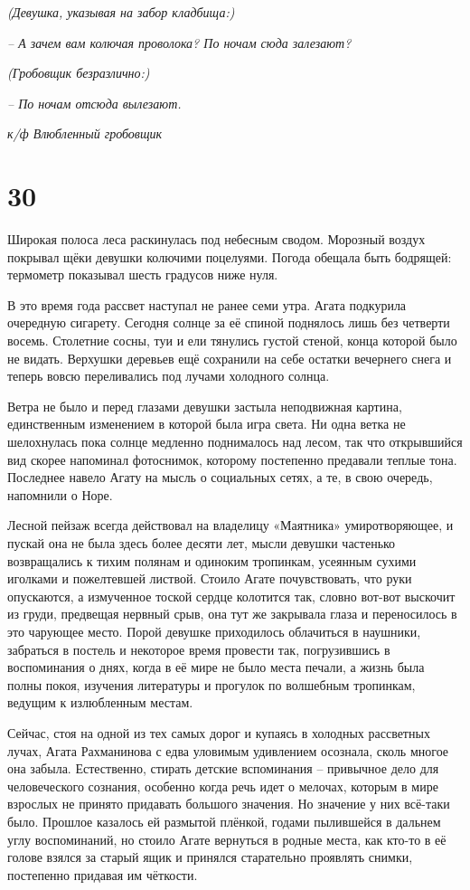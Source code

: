 \documentclass[
  a5paperpaper,
  DIV=11,
  numbers=noendperiod]{scrreprt}
\begin{document}
\emph{(Девушка, указывая на забор кладбища:)}

\emph{-- А зачем вам колючая проволока? По ночам сюда залезают?}

\emph{(Гробовщик безразлично:)}

\emph{-- По ночам отсюда вылезают.}

\emph{к/ф Влюбленный гробовщик}

\section*{30}\label{30}


Широкая полоса леса раскинулась под небесным сводом. Морозный воздух
покрывал щёки девушки колючими поцелуями. Погода обещала быть бодрящей:
термометр показывал шесть градусов ниже нуля.

В это время года рассвет наступал не ранее семи утра. Агата подкурила
очередную сигарету. Сегодня солнце за её спиной поднялось лишь без
четверти восемь. Столетние сосны, туи и ели тянулись густой стеной,
конца которой было не видать. Верхушки деревьев ещё сохранили на себе
остатки вечернего снега и теперь вовсю переливались под лучами холодного
солнца.

Ветра не было и перед глазами девушки застыла неподвижная картина,
единственным изменением в которой была игра света. Ни одна ветка не
шелохнулась пока солнце медленно поднималось над лесом, так что
открывшийся вид скорее напоминал фотоснимок, которому постепенно
предавали теплые тона. Последнее навело Агату на мысль о социальных
сетях, а те, в свою очередь, напомнили о Норе.

Лесной пейзаж всегда действовал на владелицу «Маятника» умиротворяющее,
и пускай она не была здесь более десяти лет, мысли девушки частенько
возвращались к тихим полянам и одиноким тропинкам, усеянным сухими
иголками и пожелтевшей листвой. Стоило Агате почувствовать, что руки
опускаются, а измученное тоской сердце колотится так, словно вот-вот
выскочит из груди, предвещая нервный срыв, она тут же закрывала глаза и
переносилось в это чарующее место. Порой девушке приходилось облачиться
в наушники, забраться в постель и некоторое время провести так,
погрузившись в воспоминания о днях, когда в её мире не было места
печали, а жизнь была полны покоя, изучения литературы и прогулок по
волшебным тропинкам, ведущим к излюбленным местам.

Сейчас, стоя на одной из тех самых дорог и купаясь в холодных рассветных
лучах, Агата Рахманинова с едва уловимым удивлением осознала, сколь
многое она забыла. Естественно, стирать детские вспоминания -- привычное
дело для человеческого сознания, особенно когда речь идет о мелочах,
которым в мире взрослых не принято придавать большого значения. Но
значение у них всё-таки было. Прошлое казалось ей размытой плёнкой,
годами пылившейся в дальнем углу воспоминаний, но стоило Агате вернуться
в родные места, как кто-то в её голове взялся за старый ящик и принялся
старательно проявлять снимки, постепенно придавая им чёткости.
\end{document}

